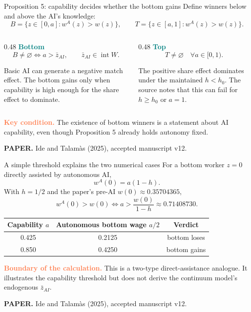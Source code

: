 \documentclass[aspectratio=169,11pt]{beamer}
\newcommand{\key}[1]{\textcolor{Teal}{\textbf{#1}}}
\newcommand{\caveat}[1]{\textcolor{Coral}{\textbf{#1}}}
\newcommand{\sourcefoot}{\scriptsize\color{Muted}\textbf{PAPER.} Ide and Talam\`as (2025), accepted manuscript v12.}
\begin{document}
\begin{frame}{Proposition 5: capability decides whether the bottom gains}
\small
Define winners below and above the AI's knowledge:
\[
B=\{z\in[0,a]:w^A(z)>w(z)\},
\qquad
T=\{z\in[a,1]:w^A(z)>w(z)\}.
\]

\begin{columns}[T,totalwidth=\textwidth]
\begin{column}{0.48\textwidth}
  \key{Bottom}
  \[
  \boxed{B\ne\varnothing
  \iff a>\bar z_{AI}},
  \qquad \bar z_{AI}\in\operatorname{int}W.
  \]

  Basic AI can generate a negative match effect. The bottom gains only when
  capability is high enough for the share effect to dominate.
\end{column}
\begin{column}{0.48\textwidth}
  \key{Top}
  \[
  \boxed{T\ne\varnothing
  \quad\forall a\in[0,1)}.
  \]

  The positive share effect dominates under the maintained $h<h_0$. The
  source notes that this can fail for $h\ge h_0$ or $a=1$.
\end{column}
\end{columns}

\vfill
\caveat{Key condition.} The existence of bottom winners is a statement about
AI capability, even though Proposition 5 already holds autonomy fixed.

\vspace{0.08cm}
\sourcefoot
\end{frame}

\begin{frame}{A simple threshold explains the two numerical cases}
\small
For a bottom worker $z=0$ directly assisted by autonomous AI,
\[
w^A(0)=a(1-h).
\]
With $h=1/2$ and the paper's pre-AI $w(0)\approx0.35704365$,
\[
w^A(0)>w(0)
\iff
a>\frac{w(0)}{1-h}
\approx\boxed{0.71408730}.
\]

\vspace{0.12cm}
\centering
\begin{tabular}{@{}ccc@{}}
\toprule
Capability $a$ & Autonomous bottom wage $a/2$ & Verdict \\
\midrule
0.425 & 0.2125 & bottom loses \\
0.850 & 0.4250 & bottom gains \\
\bottomrule
\end{tabular}

\vfill
\raggedright
\caveat{Boundary of the calculation.} This is a two-type direct-assistance
analogue. It illustrates the capability threshold but does not derive the
continuum model's endogenous \(\bar z_{AI}\).

\vspace{0.08cm}
\sourcefoot
\end{frame}
\end{document}
